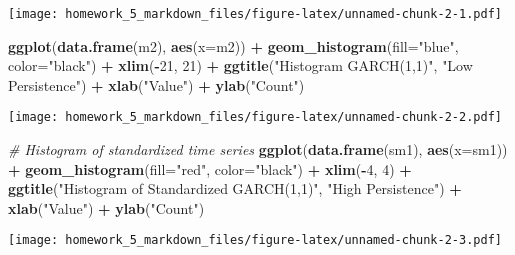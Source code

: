 \documentclass[]{article}
\newenvironment{Shaded}{\begin{snugshade}}{\end{snugshade}}
\newcommand{\KeywordTok}[1]{\textcolor[rgb]{0.13,0.29,0.53}{\textbf{#1}}}
\newcommand{\DataTypeTok}[1]{\textcolor[rgb]{0.13,0.29,0.53}{#1}}
\newcommand{\DecValTok}[1]{\textcolor[rgb]{0.00,0.00,0.81}{#1}}
\newcommand{\StringTok}[1]{\textcolor[rgb]{0.31,0.60,0.02}{#1}}
\newcommand{\CommentTok}[1]{\textcolor[rgb]{0.56,0.35,0.01}{\textit{#1}}}
\newcommand{\OperatorTok}[1]{\textcolor[rgb]{0.81,0.36,0.00}{\textbf{#1}}}
\newcommand{\NormalTok}[1]{#1}
\begin{document}
\texttt{[image: homework\_5\_markdown\_files/figure-latex/unnamed-chunk-2-1.pdf]}

\begin{Shaded}
\begin{Highlighting}[]
\KeywordTok{ggplot}\NormalTok{(}\KeywordTok{data.frame}\NormalTok{(m2), }\KeywordTok{aes}\NormalTok{(}\DataTypeTok{x=}\NormalTok{m2)) }\OperatorTok{+}
\StringTok{  }\KeywordTok{geom_histogram}\NormalTok{(}\DataTypeTok{fill=}\StringTok{"blue"}\NormalTok{, }\DataTypeTok{color=}\StringTok{"black"}\NormalTok{) }\OperatorTok{+}
\StringTok{  }\KeywordTok{xlim}\NormalTok{(}\OperatorTok{-}\DecValTok{21}\NormalTok{, }\DecValTok{21}\NormalTok{) }\OperatorTok{+}
\StringTok{  }\KeywordTok{ggtitle}\NormalTok{(}\StringTok{"Histogram GARCH(1,1)"}\NormalTok{, }\StringTok{"Low Persistence"}\NormalTok{) }\OperatorTok{+}
\StringTok{  }\KeywordTok{xlab}\NormalTok{(}\StringTok{"Value"}\NormalTok{) }\OperatorTok{+}
\StringTok{  }\KeywordTok{ylab}\NormalTok{(}\StringTok{"Count"}\NormalTok{)}
\end{Highlighting}
\end{Shaded}

\texttt{[image: homework\_5\_markdown\_files/figure-latex/unnamed-chunk-2-2.pdf]}

\begin{Shaded}
\begin{Highlighting}[]
\CommentTok{# Histogram of standardized time series}
\KeywordTok{ggplot}\NormalTok{(}\KeywordTok{data.frame}\NormalTok{(sm1), }\KeywordTok{aes}\NormalTok{(}\DataTypeTok{x=}\NormalTok{sm1)) }\OperatorTok{+}
\StringTok{  }\KeywordTok{geom_histogram}\NormalTok{(}\DataTypeTok{fill=}\StringTok{"red"}\NormalTok{, }\DataTypeTok{color=}\StringTok{"black"}\NormalTok{) }\OperatorTok{+}
\StringTok{  }\KeywordTok{xlim}\NormalTok{(}\OperatorTok{-}\DecValTok{4}\NormalTok{, }\DecValTok{4}\NormalTok{) }\OperatorTok{+}
\StringTok{  }\KeywordTok{ggtitle}\NormalTok{(}\StringTok{"Histogram of Standardized GARCH(1,1)"}\NormalTok{, }\StringTok{"High Persistence"}\NormalTok{) }\OperatorTok{+}
\StringTok{  }\KeywordTok{xlab}\NormalTok{(}\StringTok{"Value"}\NormalTok{) }\OperatorTok{+}
\StringTok{  }\KeywordTok{ylab}\NormalTok{(}\StringTok{"Count"}\NormalTok{) }
\end{Highlighting}
\end{Shaded}

\texttt{[image: homework\_5\_markdown\_files/figure-latex/unnamed-chunk-2-3.pdf]}
\end{document}
